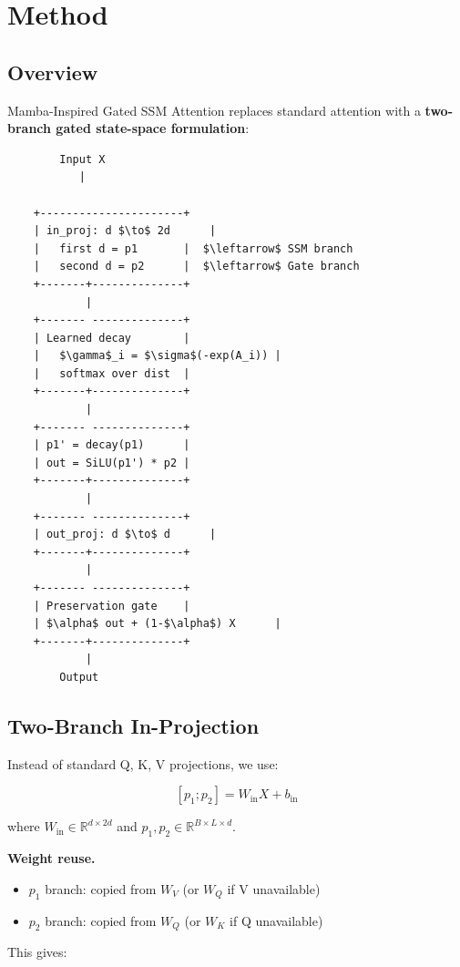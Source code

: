 \section{Method}

\subsection{Overview}

Mamba-Inspired Gated SSM Attention replaces standard attention with a 
\textbf{two-branch gated state-space formulation}:

\begin{lstlisting}
        Input X
           |
            
    +----------------------+
    | in_proj: d $\to$ 2d      |
    |   first d = p1       |  $\leftarrow$ SSM branch
    |   second d = p2      |  $\leftarrow$ Gate branch
    +-------+--------------+
            |
    +------- --------------+
    | Learned decay        |
    |   $\gamma$_i = $\sigma$(-exp(A_i)) |
    |   softmax over dist  |
    +-------+--------------+
            |
    +------- --------------+
    | p1' = decay(p1)      |
    | out = SiLU(p1') * p2 |
    +-------+--------------+
            |
    +------- --------------+
    | out_proj: d $\to$ d      |
    +-------+--------------+
            |
    +------- --------------+
    | Preservation gate    |
    | $\alpha$ out + (1-$\alpha$) X      |
    +-------+--------------+
            |
        Output
\end{lstlisting}

\subsection{Two-Branch In-Projection}

Instead of standard Q, K, V projections, we use:

\[
[p_1; p_2] = W_\text{in} X + b_\text{in}
\tag{4.1}
\]

where $W_\text{in} \in \mathbb{R}^{d \times 2d}$ and $p_1, p_2 \in \mathbb{R}^{B \times L \times d}$.

\textbf{Weight reuse.}

\begin{itemize}
\item $p_1$ branch: copied from $W_V$ (or $W_Q$ if V unavailable)
\item $p_2$ branch: copied from $W_Q$ (or $W_K$ if Q unavailable)

\end{itemize}
This gives:

